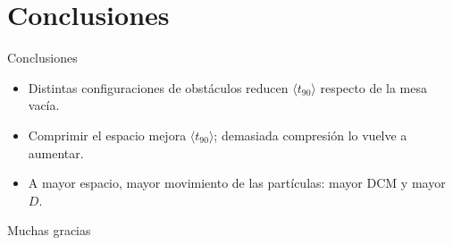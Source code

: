 \documentclass[aspectratio=169]{beamer}
\begin{document}
\section{Conclusiones}

\begin{frame}{Conclusiones}
  \begin{itemize}
    \item Distintas configuraciones de obstáculos reducen $\langle t_{90} \rangle$ respecto de la
      mesa vacía.
    \item Comprimir el espacio mejora $\langle t_{90} \rangle$; demasiada compresión lo vuelve a
      aumentar.
    \item A mayor espacio, mayor movimiento de las partículas: mayor DCM y mayor $D$.
  \end{itemize}
\end{frame}

\begin{frame}[plain]
  \centering
  \vfill
  {\Huge Muchas gracias}
  \vfill
\end{frame}
\end{document}
